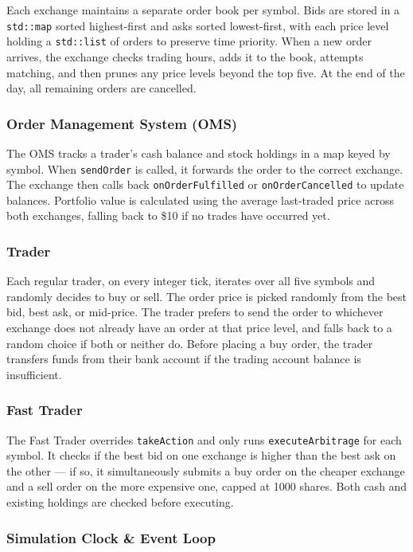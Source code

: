 \documentclass[11pt, a4paper]{article}
\begin{document}
Each exchange maintains a separate order book per symbol. Bids are stored in a \texttt{std::map} sorted highest-first and asks sorted lowest-first, with each price level holding a \texttt{std::list} of orders to preserve time priority. When a new order arrives, the exchange checks trading hours, adds it to the book, attempts matching, and then prunes any price levels beyond the top five. At the end of the day, all remaining orders are cancelled.

\subsubsection{Order Management System (OMS)}

The OMS tracks a trader's cash balance and stock holdings in a map keyed by symbol. When \texttt{sendOrder} is called, it forwards the order to the correct exchange. The exchange then calls back \texttt{onOrderFulfilled} or \texttt{onOrderCancelled} to update balances. Portfolio value is calculated using the average last-traded price across both exchanges, falling back to \$10 if no trades have occurred yet.

\subsubsection{Trader}

Each regular trader, on every integer tick, iterates over all five symbols and randomly decides to buy or sell. The order price is picked randomly from the best bid, best ask, or mid-price. The trader prefers to send the order to whichever exchange does not already have an order at that price level, and falls back to a random choice if both or neither do. Before placing a buy order, the trader transfers funds from their bank account if the trading account balance is insufficient.

\subsubsection{Fast Trader}

The Fast Trader overrides \texttt{takeAction} and only runs \texttt{executeArbitrage} for each symbol. It checks if the best bid on one exchange is higher than the best ask on the other — if so, it simultaneously submits a buy order on the cheaper exchange and a sell order on the more expensive one, capped at 1000 shares. Both cash and existing holdings are checked before executing.

\subsubsection{Simulation Clock \& Event Loop}
\end{document}
